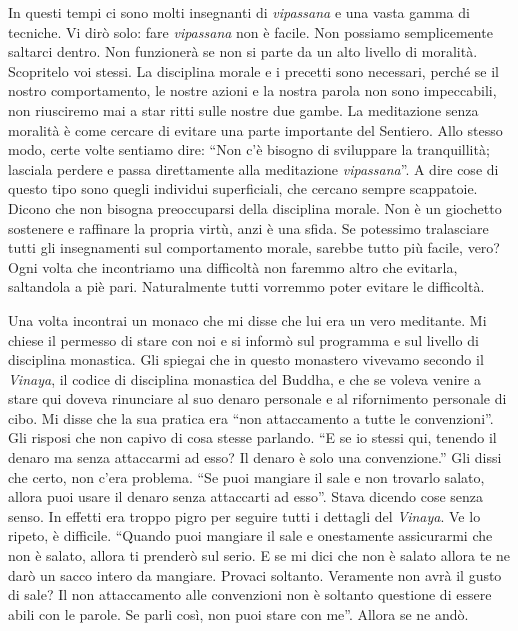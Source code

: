 In questi tempi ci sono molti insegnanti di \emph{vipassana} e una vasta gamma
di tecniche. Vi dirò solo: fare \emph{vipassana} non è facile. Non possiamo
semplicemente saltarci dentro. Non funzionerà se non si parte da un alto
livello di moralità. Scopritelo voi stessi. La disciplina morale e i
precetti sono necessari, perché se il nostro comportamento, le nostre
azioni e la nostra parola non sono impeccabili, non riusciremo mai a
star ritti sulle nostre due gambe. La meditazione senza moralità è come
cercare di evitare una parte importante del Sentiero. Allo stesso modo,
certe volte sentiamo dire: ``Non c'è bisogno di sviluppare la
tranquillità; lasciala perdere e passa direttamente alla meditazione
\emph{vipassana}''. A dire cose di questo tipo sono quegli individui
superficiali, che cercano sempre scappatoie. Dicono che non bisogna
preoccuparsi della disciplina morale. Non è un giochetto sostenere e
raffinare la propria virtù, anzi è una sfida. Se potessimo tralasciare
tutti gli insegnamenti sul comportamento morale, sarebbe tutto più
facile, vero? Ogni volta che incontriamo una difficoltà non faremmo
altro che evitarla, saltandola a piè pari. Naturalmente tutti vorremmo
poter evitare le difficoltà.

Una volta incontrai un monaco che mi disse che lui era un vero
meditante. Mi chiese il permesso di stare con noi e si informò sul
programma e sul livello di disciplina monastica. Gli spiegai che in
questo monastero vivevamo secondo il \emph{Vinaya}, il codice di
disciplina monastica del Buddha, e che se voleva venire a stare qui
doveva rinunciare al suo denaro personale e al rifornimento personale di
cibo. Mi disse che la sua pratica era ``non attaccamento a tutte le
convenzioni''. Gli risposi che non capivo di cosa stesse parlando. ``E
se io stessi qui, tenendo il denaro ma senza attaccarmi ad esso? Il
denaro è solo una convenzione.'' Gli dissi che certo, non c'era
problema. ``Se puoi mangiare il sale e non trovarlo salato, allora puoi
usare il denaro senza attaccarti ad esso''. Stava dicendo cose senza
senso. In effetti era troppo pigro per seguire tutti i dettagli
del \emph{Vinaya}. Ve lo ripeto, è difficile. ``Quando puoi mangiare il
sale e onestamente assicurarmi che non è salato, allora ti prenderò sul
serio. E se mi dici che non è salato allora te ne darò un sacco intero
da mangiare. Provaci soltanto. Veramente non avrà il gusto di sale? Il
non attaccamento alle convenzioni non è soltanto questione di essere
abili con le parole. Se parli così, non puoi stare con me''. Allora se
ne andò.

